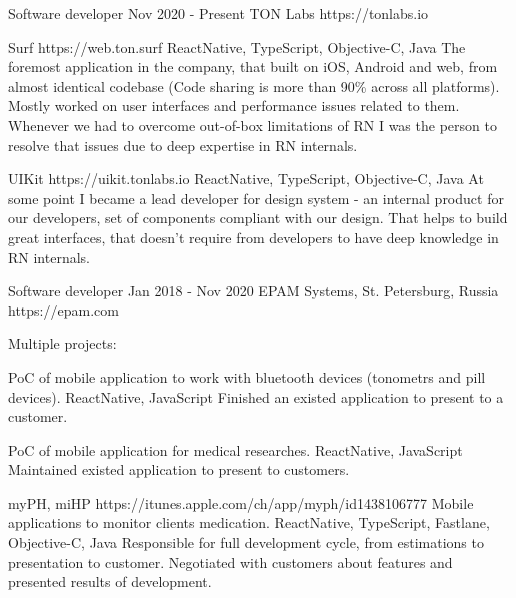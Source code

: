 \documentclass[11pt,a4paper,sans]{awesomecv}
\begin{document}
\begin{cventries}
\cventry
    {Software developer}
    {Nov 2020 - Present}
    {TON Labs}
    {https://tonlabs.io}
    {
      \begin{cvprojects}{0.8ex}
      \item \cvproject
        {Surf}
        {https://web.ton.surf}{}
        {ReactNative, TypeScript, Objective-C, Java}
        {
          The foremost application in the company,
          that built on iOS, Android and web, from almost identical codebase (Code sharing is more than 90\% across all platforms).
          Mostly worked on user interfaces and performance issues related to them.
          Whenever we had to overcome out-of-box limitations of RN I was the person to resolve that issues due to deep expertise in RN internals.
        }
      \item \cvproject
        {UIKit}
        {https://uikit.tonlabs.io}{}
        {ReactNative, TypeScript, Objective-C, Java}
        {
          At some point I became a lead developer for design system - an internal product for our developers, set of components compliant with our design.
          That helps to build great interfaces, that doesn't require from developers to have deep knowledge in RN internals.
        }
    \end{cvprojects}
    }
\cventry
    {Software developer}
    {Jan 2018 - Nov 2020}
    {EPAM Systems, St. Petersburg, Russia}
    {https://epam.com}
    {
      Multiple projects:\newline
      \begin{cvprojects}{0.8ex}
      \item \cvproject
          {PoC of mobile application to work with bluetooth devices (tonometrs and pill devices).}
          {}{}
          {ReactNative, JavaScript}
          {Finished an existed application to present to a customer.}
      \item \cvproject
          {PoC of mobile application for medical researches.}
          {}{}
          {ReactNative, JavaScript}
          {Maintained existed application to present to customers.}
      \item \cvproject
          {myPH, miHP}
          {https://itunes.apple.com/ch/app/myph/id1438106777}
          {Mobile applications to monitor clients medication.}
          {ReactNative, TypeScript, Fastlane, Objective-C, Java}
          {
            Responsible for full development cycle, from estimations to presentation to customer.
            Negotiated with customers about features and presented results of development.
}
\end{cvprojects}}
\end{cventries}
\end{document}
